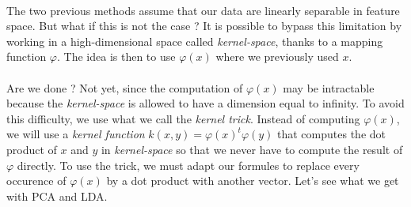 
\paragraph{}
The two previous methods assume that our data are linearly separable in feature space. But what if this is not the case ? It is possible to bypass this limitation by working in a high-dimensional space called \emph{kernel-space}, thanks to a mapping function $\varphi$. The idea is then to use $\varphi(x)$ where we previously used $x$.

\paragraph{}
Are we done ? Not yet, since the computation of $\varphi(x)$ may be intractable because the \emph{kernel-space} is allowed to have a dimension equal to infinity. To avoid this difficulty, we use what we call the \emph{kernel trick}. Instead of computing $\varphi(x)$, we will use a \emph{kernel function} $k(x, y) = \varphi(x)^t\varphi(y)$ that computes the dot product of $x$ and $y$ in \emph{kernel-space} so that we never have to compute the result of $\varphi$ directly. To use the trick, we must adapt our formules to replace every occurence of $\varphi(x)$ by a dot product with another vector. Let's see what we get with PCA and LDA.

